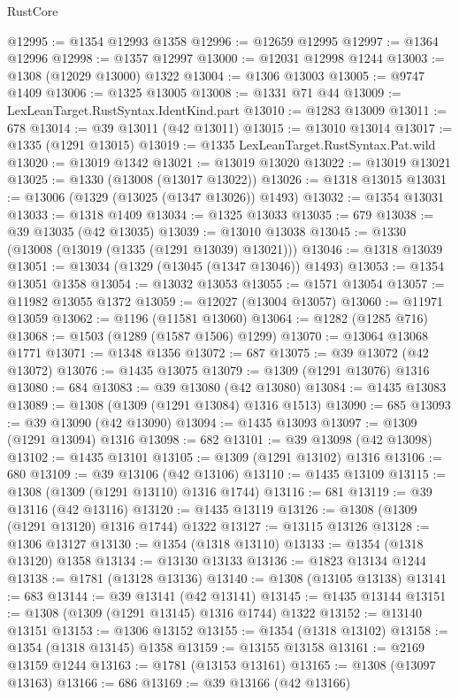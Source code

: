 \begin{lexlean}{RustCore}
\begin{coremodule}
@12995 := @1354 @12993 @1358
@12996 := @12659 @12995
@12997 := @1364 @12996
@12998 := @1357 @12997
@13000 := @12031 @12998 @1244
@13003 := @1308 (@12029 @13000) @1322
@13004 := @1306 @13003
@13005 := @9747 @1409
@13006 := @1325 @13005
@13008 := @1331 @71 @44
@13009 := LexLeanTarget.RustSyntax.IdentKind.part
@13010 := @1283 @13009
@13011 := 678
@13014 := @39 @13011 (@42 @13011)
@13015 := @13010 @13014
@13017 := @1335 (@1291 @13015)
@13019 := @1335 LexLeanTarget.RustSyntax.Pat.wild
@13020 := @13019 @1342
@13021 := @13019 @13020
@13022 := @13019 @13021
@13025 := @1330 (@13008 (@13017 @13022))
@13026 := @1318 @13015
@13031 := @13006 (@1329 (@13025 (@1347 @13026)) @1493)
@13032 := @1354 @13031
@13033 := @1318 @1409
@13034 := @1325 @13033
@13035 := 679
@13038 := @39 @13035 (@42 @13035)
@13039 := @13010 @13038
@13045 := @1330 (@13008 (@13019 (@1335 (@1291 @13039) @13021)))
@13046 := @1318 @13039
@13051 := @13034 (@1329 (@13045 (@1347 @13046)) @1493)
@13053 := @1354 @13051 @1358
@13054 := @13032 @13053
@13055 := @1571 @13054
@13057 := @11982 @13055 @1372
@13059 := @12027 (@13004 @13057)
@13060 := @11971 @13059
@13062 := @1196 (@11581 @13060)
@13064 := @1282 (@1285 @716)
@13068 := @1503 (@1289 (@1587 @1506) @1299)
@13070 := @13064 @13068 @1771
@13071 := @1348 @1356
@13072 := 687
@13075 := @39 @13072 (@42 @13072)
@13076 := @1435 @13075
@13079 := @1309 (@1291 @13076) @1316
@13080 := 684
@13083 := @39 @13080 (@42 @13080)
@13084 := @1435 @13083
@13089 := @1308 (@1309 (@1291 @13084) @1316 @1513)
@13090 := 685
@13093 := @39 @13090 (@42 @13090)
@13094 := @1435 @13093
@13097 := @1309 (@1291 @13094) @1316
@13098 := 682
@13101 := @39 @13098 (@42 @13098)
@13102 := @1435 @13101
@13105 := @1309 (@1291 @13102) @1316
@13106 := 680
@13109 := @39 @13106 (@42 @13106)
@13110 := @1435 @13109
@13115 := @1308 (@1309 (@1291 @13110) @1316 @1744)
@13116 := 681
@13119 := @39 @13116 (@42 @13116)
@13120 := @1435 @13119
@13126 := @1308 (@1309 (@1291 @13120) @1316 @1744) @1322
@13127 := @13115 @13126
@13128 := @1306 @13127
@13130 := @1354 (@1318 @13110)
@13133 := @1354 (@1318 @13120) @1358
@13134 := @13130 @13133
@13136 := @1823 @13134 @1244
@13138 := @1781 (@13128 @13136)
@13140 := @1308 (@13105 @13138)
@13141 := 683
@13144 := @39 @13141 (@42 @13141)
@13145 := @1435 @13144
@13151 := @1308 (@1309 (@1291 @13145) @1316 @1744) @1322
@13152 := @13140 @13151
@13153 := @1306 @13152
@13155 := @1354 (@1318 @13102)
@13158 := @1354 (@1318 @13145) @1358
@13159 := @13155 @13158
@13161 := @2169 @13159 @1244
@13163 := @1781 (@13153 @13161)
@13165 := @1308 (@13097 @13163)
@13166 := 686
@13169 := @39 @13166 (@42 @13166)

\end{coremodule}
\end{lexlean}

